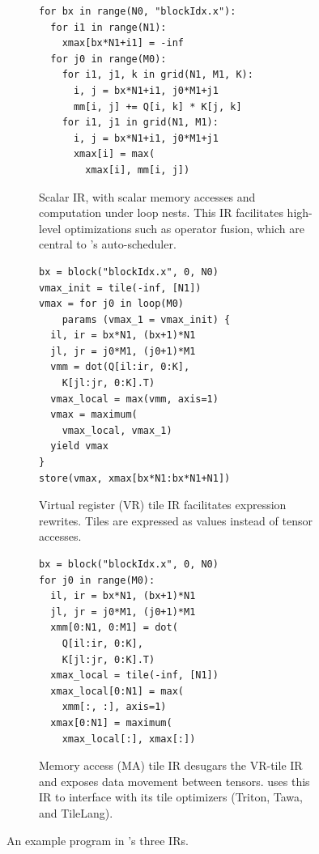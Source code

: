 \begin{figure}[ht]
  \begin{subfigure}[b]{0.36\textwidth}
    \centering
    \begin{verbatim}
for bx in range(N0, "blockIdx.x"):
  for i1 in range(N1):
    xmax[bx*N1+i1] = -inf
  for j0 in range(M0):
    for i1, j1, k in grid(N1, M1, K):
      i, j = bx*N1+i1, j0*M1+j1
      mm[i, j] += Q[i, k] * K[j, k]
    for i1, j1 in grid(N1, M1):
      i, j = bx*N1+i1, j0*M1+j1
      xmax[i] = max(
        xmax[i], mm[i, j])
    \end{verbatim}
    \caption{Scalar IR, with scalar memory accesses and computation under loop nests.
      This IR facilitates high-level optimizations such as operator fusion,
    which are central to \NAME{}'s auto-scheduler.}
  \end{subfigure}
  \hspace{2pt}
  \begin{subfigure}[b]{0.32\textwidth}
    \centering
    \begin{verbatim}
bx = block("blockIdx.x", 0, N0)
vmax_init = tile(-inf, [N1])
vmax = for j0 in loop(M0)
    params (vmax_1 = vmax_init) {
  il, ir = bx*N1, (bx+1)*N1
  jl, jr = j0*M1, (j0+1)*M1
  vmm = dot(Q[il:ir, 0:K],
    K[jl:jr, 0:K].T)
  vmax_local = max(vmm, axis=1)
  vmax = maximum(
    vmax_local, vmax_1)
  yield vmax
}
store(vmax, xmax[bx*N1:bx*N1+N1])
    \end{verbatim}
    \caption{Virtual register (VR) tile IR facilitates expression rewrites.
    Tiles are expressed as values instead of tensor accesses.}
    \label{fig:vr-ir-example}
  \end{subfigure}
  \hspace{2pt}
  \begin{subfigure}[b]{0.31\textwidth}
    \centering
    \begin{verbatim}
bx = block("blockIdx.x", 0, N0)
for j0 in range(M0):
  il, ir = bx*N1, (bx+1)*N1
  jl, jr = j0*M1, (j0+1)*M1
  xmm[0:N1, 0:M1] = dot(
    Q[il:ir, 0:K],
    K[jl:jr, 0:K].T)
  xmax_local = tile(-inf, [N1])
  xmax_local[0:N1] = max(
    xmm[:, :], axis=1)
  xmax[0:N1] = maximum(
    xmax_local[:], xmax[:])
    \end{verbatim}
    \caption{Memory access (MA) tile IR desugars the VR-tile IR and exposes data
      movement between tensors. \NAME{} uses this IR to interface with its tile
      optimizers (Triton, Tawa, and TileLang).
    }
  \end{subfigure}
  \vspace*{-1.5em}
  \caption{An example program in \NAME{}'s three IRs.}
  \label{fig:3ir-example}
  \vspace*{-1em}
\end{figure}
